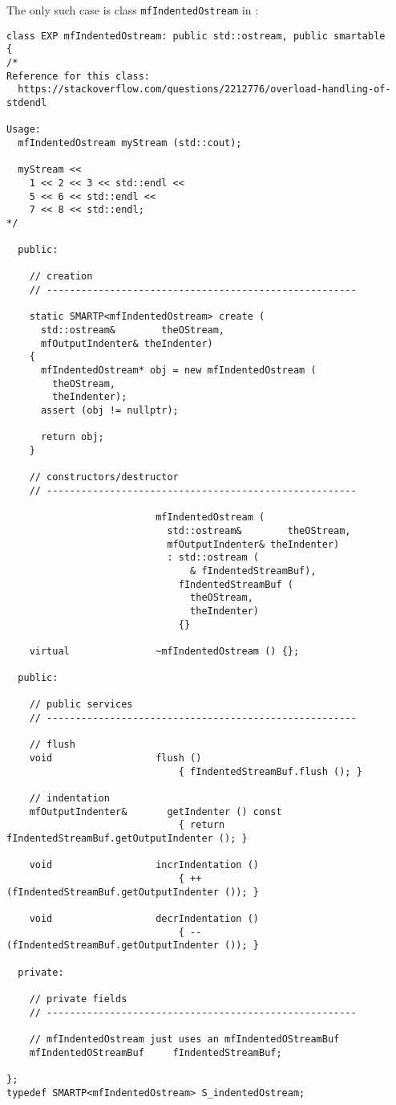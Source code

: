 The only such case is class   {\tt mfIndentedOstream} in :
\begin{lstlisting}[language=CPlusPlus]
class EXP mfIndentedOstream: public std::ostream, public smartable
{
/*
Reference for this class:
  https://stackoverflow.com/questions/2212776/overload-handling-of-stdendl

Usage:
  mfIndentedOstream myStream (std::cout);

  myStream <<
    1 << 2 << 3 << std::endl <<
    5 << 6 << std::endl <<
    7 << 8 << std::endl;
*/

  public:

    // creation
    // ------------------------------------------------------

    static SMARTP<mfIndentedOstream> create (
      std::ostream&        theOStream,
      mfOutputIndenter& theIndenter)
    {
      mfIndentedOstream* obj = new mfIndentedOstream (
        theOStream,
        theIndenter);
      assert (obj != nullptr);

      return obj;
    }

    // constructors/destructor
    // ------------------------------------------------------

                          mfIndentedOstream (
                            std::ostream&        theOStream,
                            mfOutputIndenter& theIndenter)
                            : std::ostream (
                                & fIndentedStreamBuf),
                              fIndentedStreamBuf (
                                theOStream,
                                theIndenter)
                              {}

    virtual               ~mfIndentedOstream () {};

  public:

    // public services
    // ------------------------------------------------------

    // flush
    void                  flush ()
                              { fIndentedStreamBuf.flush (); }

    // indentation
    mfOutputIndenter&       getIndenter () const
                              { return fIndentedStreamBuf.getOutputIndenter (); }

    void                  incrIndentation ()
                              { ++ (fIndentedStreamBuf.getOutputIndenter ()); }

    void                  decrIndentation ()
                              { -- (fIndentedStreamBuf.getOutputIndenter ()); }

  private:

    // private fields
    // ------------------------------------------------------

    // mfIndentedOstream just uses an mfIndentedOStreamBuf
    mfIndentedOStreamBuf     fIndentedStreamBuf;

};
typedef SMARTP<mfIndentedOstream> S_indentedOstream;
\end{lstlisting}


